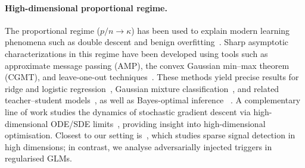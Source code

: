 \documentclass[11pt]{article}
\begin{document}
\paragraph{High-dimensional proportional regime.}
The proportional regime ($p/n \to \kappa$) has been used to explain modern learning phenomena such as double descent and benign overfitting~\citep{hastie2019surprises, belkin2019, bartlett2020benign, bartlett21deep}. 
Sharp asymptotic characterizations in this regime have been developed using tools such as approximate message passing (AMP), the convex Gaussian min--max theorem (CGMT), and leave-one-out techniques~\citep{stojnic_framework_2013,thrampoulidis_regularized_2015,rangan_generalized_2012,javanmard_state_2012,donoho_high_2013,el_karoui_robust_2013,mai_high_2020}. These methods yield precise results for ridge and logistic regression~\citep{dobriban2018high,sur2019modern,montanari2025generalization}, Gaussian mixture classification~\citep{mai_high_2020,deng_model_2020,loureiro_learning_2021}, and related teacher--student models~\citep{liang_precise_2022,montanari_generalization_2023}, as well as Bayes-optimal inference ~\citep{barbier_optimal_2019,seroussi_lower_2022}. %
A complementary line of work studies the dynamics of stochastic gradient descent via high-dimensional ODE/SDE limits~\citep{paquette24homogenization, collins2024hitting, arous2022highdimensional}, providing insight into high-dimensional optimisation. %
Closest to our setting is~\citet{barnfield_high-dimensional_2025}, which studies sparse signal detection in high dimensions; in contrast, we analyse adversarially injected triggers in regularised GLMs.
\end{document}
